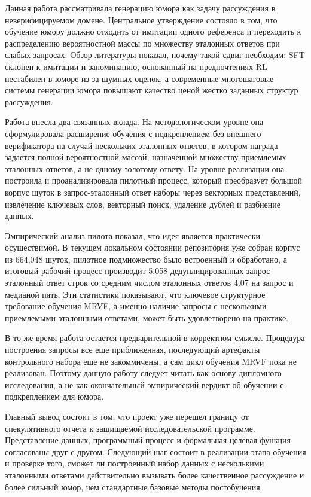 Данная работа рассматривала генерацию юмора как задачу рассуждения в неверифицируемом домене. Центральное утверждение состояло в том, что обучение юмору должно отходить от имитации одного референса и переходить к распределению вероятностной массы по множеству эталонных ответов при слабых запросах. Обзор литературы показал, почему такой сдвиг необходим: SFT склонен к имитации и запоминанию, основанный на предпочтениях RL нестабилен в юморе из-за шумных оценок, а современные многошаговые системы генерации юмора повышают качество ценой жестко заданных структур рассуждения.

Работа внесла два связанных вклада. На методологическом уровне она сформулировала расширение обучения с подкреплением без внешнего верификатора на случай нескольких эталонных ответов, в котором награда задается полной вероятностной массой, назначенной множеству приемлемых эталонных ответов, а не одному золотому ответу. На уровне реализации она построила и проанализировала пилотный процесс, который преобразует большой корпус шуток в запрос-эталонный ответ наборы через векторных представлений, извлечение ключевых слов, векторный поиск, удаление дублей и разбиение данных.

Эмпирический анализ пилота показал, что идея является практически осуществимой. В текущем локальном состоянии репозитория уже собран корпус из 664{,}048 шуток, пилотное подмножество было встроенный и обработано, а итоговый рабочий процесс производит 5{,}058 дедуплицированных запрос-эталонный ответ строк со средним числом эталонных ответов 4.07 на запрос и медианой пять. Эти статистики показывают, что ключевое структурное требование обучения MRVF, а именно наличие запросы с несколькими приемлемыми эталонными ответами, может быть удовлетворено на практике.

В то же время работа остается предварительной в корректном смысле. Процедура построения запросы все еще приближенная, последующий артефакты контрольного набора еще не закоммичены, а сам цикл обучения MRVF пока не реализован. Поэтому данную работу следует читать как основу дипломного исследования, а не как окончательный эмпирический вердикт об обучении с подкреплением для юмора.

Главный вывод состоит в том, что проект уже перешел границу от спекулятивного отчета к защищаемой исследовательской программе. Представление данных, программный процесс и формальная целевая функция согласованы друг с другом. Следующий шаг состоит в реализации этапа обучения и проверке того, сможет ли построенный набор данных с несколькими эталонными ответами действительно вызывать более качественное рассуждение и более сильный юмор, чем стандартные базовые методы постобучения.
